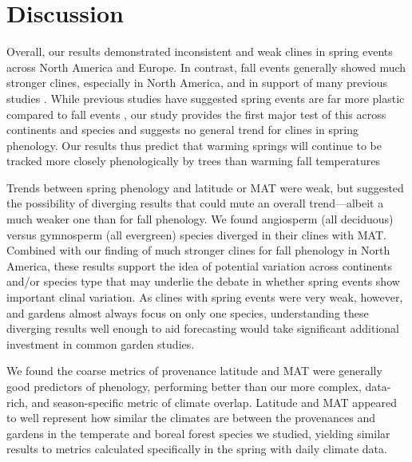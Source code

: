 \documentclass[12pt]{article}
\begin{document}

\section{Discussion}

Overall, our results demonstrated inconsistent and weak clines in spring events across North America and Europe. In contrast, fall events generally showed much stronger clines, especially in North America, and in support of many previous studies \citep{AitkenBemmels16, Alberto13}. While previous studies have suggested spring events are far more plastic compared to fall events \citep{Li97,farmer93,mimura07}, our study provides the first major test of this across continents and species and suggests no general trend for clines in spring phenology. Our results thus predict that warming springs will continue to be tracked more closely phenologically by trees than warming fall temperatures \citep{IPCC22}

Trends between spring phenology and latitude or MAT were weak, but suggested the possibility of diverging results that could mute an overall trend---albeit a much weaker one than for fall phenology. We found angiosperm (all deciduous) versus gymnosperm (all evergreen) species diverged in their clines with MAT. Combined with our finding of much stronger clines for fall phenology in North America, these results support the idea of potential variation across continents and/or species type that may underlie the debate in whether spring events show important clinal variation. As clines with spring events were very weak, however, and gardens almost always focus on only one species, understanding these diverging results well enough to aid forecasting would take significant additional investment in common garden studies. %

We found the coarse metrics of provenance latitude and MAT were generally good predictors of phenology, performing better than our more complex, data-rich, and season-specific metric of climate overlap. Latitude and MAT appeared to well represent how similar the climates are between the provenances and gardens in the temperate and boreal forest species we studied, yielding similar results to metrics calculated specifically in the spring with daily climate data. %
\end{document}

